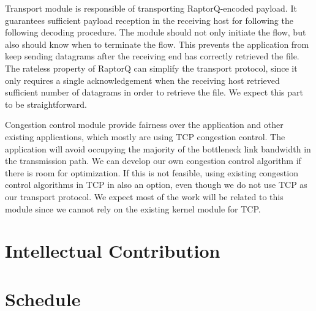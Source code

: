 \documentclass{sig-alternate-10pt}
\begin{document}
Transport module is responsible of transporting RaptorQ-encoded payload. It
guarantees sufficient payload reception in the receiving host for following the
following decoding procedure. The module should not only initiate the flow, but
also should know when to terminate the flow. This prevents the application from
keep sending datagrams after the receiving end has correctly retrieved the file.
The rateless property of RaptorQ can simplify the transport protocol, since it
only requires a single acknowledgement when the receiving host retrieved
sufficient number of datagrams in order to retrieve the file. We expect this
part to be straightforward.

Congestion control module provide fairness over the application and other
existing applications, which mostly are using TCP congestion control. The
application will avoid occupying the majority of the bottleneck link bandwidth in
the transmission path. We can develop our own congestion control algorithm if
there is room for optimization. If this is not feasible, using existing
congestion control algorithms in TCP in also an option, even though we do not
use TCP as our transport protocol. We expect most of the work will be related to
this module since we cannot rely on the existing kernel module for TCP.

\section{Intellectual Contribution}

\section{Schedule}



\end{document}
